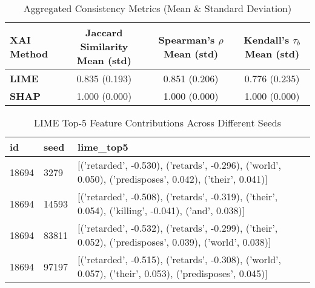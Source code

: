 \documentclass{article}
\begin{document}
\begin{table}[ht]
\centering
\caption{Aggregated Consistency Metrics (Mean \& Standard Deviation)}
\label{tab:consistency_metrics}
\begin{tabular}{lccc}
\toprule
\textbf{XAI Method} & \textbf{Jaccard Similarity Mean (std)} & \textbf{Spearman's $\rho$ Mean (std)} & \textbf{Kendall's $\tau_b$ Mean (std)} \\
\midrule
\textbf{LIME} & 0.835 (0.193) & 0.851 (0.206) & 0.776 (0.235) \\
\textbf{SHAP} & 1.000 (0.000) & 1.000 (0.000) & 1.000 (0.000) \\
\bottomrule
\end{tabular}
\end{table}

\begin{table}[ht]
\centering
\caption{LIME Top-5 Feature Contributions Across Different Seeds}
\label{tab:lime_top5_contributions}
\begin{tabular}{llp{10cm}}
\toprule
\textbf{id} & \textbf{seed} & \textbf{lime\_top5} \\
\midrule
18694 & 3279  & [('retarded', -0.530), ('retards', -0.296), ('world', 0.050), ('predisposes', 0.042), ('their', 0.041)] \\
18694 & 14593 & [('retarded', -0.508), ('retards', -0.319), ('their', 0.054), ('killing', -0.041), ('and', 0.038)] \\
18694 & 83811 & [('retarded', -0.532), ('retards', -0.299), ('their', 0.052), ('predisposes', 0.039), ('world', 0.038)] \\
18694 & 97197 & [('retarded', -0.515), ('retards', -0.308), ('world', 0.057), ('their', 0.053), ('predisposes', 0.045)] \\
\bottomrule
\end{tabular}
\end{table}
\end{document}
